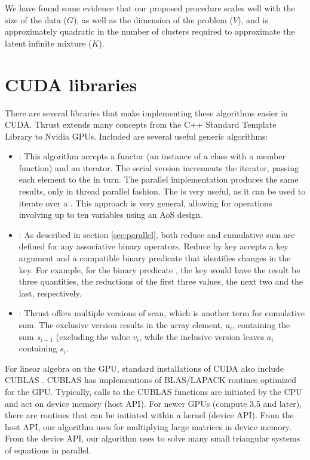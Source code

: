 {We have found some evidence that our proposed procedure scales well with the size of the data ($G$), as well as the dimension of the problem ($V$), and is approximately quadratic in the number of clusters required to approximate the latent infinite mixture ($K$).

\appendix
\section{CUDA libraries}
There are several libraries that make implementing these algorithms easier in CUDA. Thrust \citep{thrust} extends many concepts from the C++ Standard Template Library to Nvidia GPUs. Included are several useful generic algorithms:
\begin{itemize}
\item {}: This algorithm accepts a functor (an
  instance of a class with a member  function)
  and an iterator. The serial version increments the iterator, passing
  each element to the  in turn. The parallel implementation
  produces the same results, only in thread parallel fashion. The
   is very useful, as it can be used
  to iterate
  over a . This approach is very general, allowing
  for operations involving up to ten variables using an AoS
  design.

\item {}: As described in section
  \ref{sec:parallel}, both reduce and cumulative sum are defined for any associative binary operators. Reduce by key accepts a key argument and a compatible binary predicate that identifies changes in the key. For example, for the binary predicate , the key  would have the result be three quantities, the reductions of the first three values, the next two and the last, respectively.

\item {}: Thrust
  offers multiple versions of scan, which is another term for cumulative sum. The exclusive
  version results in the array element, $a_i$, containing the sum $s_{i-1}$ (excluding the value $v_i$, while the inclusive version leaves $a_i$ containing $s_i$.
\end{itemize}

For linear algebra on the GPU, standard installations of CUDA also
include CUBLAS \cite{cublas}. CUBLAS has implementions of BLAS/LAPACK
routines optimized for the GPU. Typically, calls to the CUBLAS
functions are initiated by the CPU and act on device memory (host
API). For newer GPUs (compute 3.5 and later), there are routines that
can be initiated within a kernel (device API). From the host API, our
algorithm uses  for multiplying large matrices in
device memory. From the
device API, our algorithm uses  to solve many small triangular
systems of equations in parallel.

}
